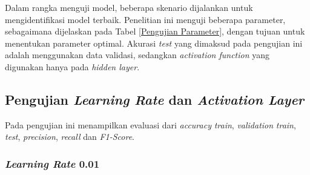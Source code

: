     Dalam rangka menguji model, beberapa skenario dijalankan untuk mengidentifikasi model terbaik.
     Penelitian ini menguji beberapa parameter, sebagaimana dijelaskan pada Tabel \ref{Pengujian Parameter}, dengan 
     tujuan untuk menentukan parameter optimal.  Akurasi \textit{test} yang dimaksud pada pengujian 
     ini adalah menggunakan data validasi, sedangkan \textit{activation function} yang digunakan 
     hanya pada \textit{hidden layer}.


    
        
\subsection{Pengujian \textit{Learning Rate} dan \textit{Activation Layer}}

    Pada pengujian ini menampilkan evaluasi dari \textit{accuracy} \textit{train}, \textit{validation} \textit{train}, \textit{test}, \textit{precision}, \textit{recall} dan \textit{F1-Score}.

\subsubsection{\textit{Learning Rate} 0.01}

